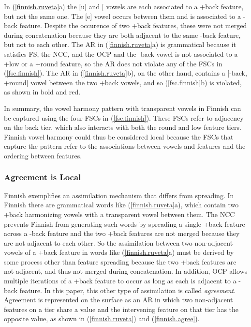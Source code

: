 \documentclass[,doc,floatsintext]{apa6}
\theoremstyle{definition}
\theoremstyle{definition}
\theoremstyle{definition}
\theoremstyle{remark}
\begin{document}
In (\ref{finnish.ruveta}a) the {[}u{]} and {[}\textipa{A}{]} vowels are
each associated to a +back feature, but not the same one. The {[}e{]}
vowel occurs between them and is associated to a -back feature. Despite
the occurence of two +back features, these were not merged during
concatenation because they are both adjacent to the same -back feature,
but not to each other. The AR in (\ref{finnish.ruveta}a) is grammatical
because it satisfies FS, the NCC, and the OCP and the -back vowel is not
associated to a +low or a +round feature, so the AR does not violate any
of the FSCs in (\ref{fsc.finnish}). The AR in (\ref{finnish.ruveta}b),
on the other hand, contains a {[}-back, +round{]} vowel between the two
+back vowels, and so (\ref{fsc.finnish}b) is violated, as shown in bold
and red.

In summary, the vowel harmony pattern with transparent vowels in Finnish
can be captured using the four FSCs in (\ref{fsc.finnish}). These FSCs
refer to adjacency on the back tier, which also interacts with both the
round and low feature tiers. Finnish vowel harmony could thus be
considered local because the FSCs that capture the pattern refer to the
associations between vowels and features and the ordering between
features.

\subsubsection{Agreement is Local}\label{agreement-is-local}

Finnish exemplifies an assimilation mechanism that differs from
spreading. In Finnish there are grammatical words like
(\ref{finnish.ruveta}a), which contain two +back harmonizing vowels with
a transparent vowel between them. The NCC prevents Finnish from
generating such words by spreading a single +back feature across a -back
feature and the two +back features are not merged because they are not
adjacent to each other. So the assimilation between two non-adjacent
vowels of a +back feature in words like (\ref{finnish.ruveta}a) must be
derived by some process other than feature spreading because the two
+back features are not adjacent, and thus not merged during
concatenation. In addition, OCP allows multiple iterations of a +back
feature to occur as long as each is adjacent to a -back feature. In this
paper, this other type of assimilation is called \emph{agreement}.
Agreement is represented on the surface as an AR in which two
non-adjacent features on a tier share a value and the intervening
feature on that tier has the opposite value, as shown in
(\ref{finnish.ruveta}) and (\ref{finnish.agree}).
\end{document}
